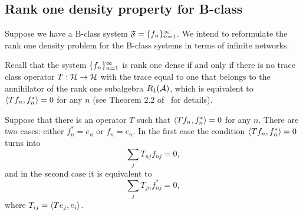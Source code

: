 \documentclass[12pt,oneside,a4paper]{amsart}
\begin{document}


    \medskip
    \subsection{Rank one density property for B-class}
      Suppose we have a B-class system $\fsys=\seq{f}$.
      We intend to reformulate the rank one density problem for the B-class systems in terms of infinite networks.

      Recall that the system $\seq{f}$ is rank one dense
        if and only if there is no trace class operator $T: \cal{H} \to \cal{H}$ with the trace equal to one
        that belongs to the annihilator of the rank one subalgebra $R_1(\cal{A})$, which is equivalent to
        $\inner{Tf_n}{f_n^*} = 0$ for any $n$
        (see Theorem 2.2 of~\cite{katavolos} for details).

      Suppose that there is an operator $T$ such that $\inner{Tf_n}{f_n^*} = 0$ for any $n$.
      There are two cases: either $f^*_n = e_n$ or $f_n = e_n$.
      In the first case the condition $\inner{Tf_n}{f_n^*} = 0$ turns into
      \begin{equation}
          \label{left-eqn}
          \sum_j T_{nj} f_{nj} = 0,
      \end{equation}
      and in the second case it is equivalent to
      \begin{equation}
          \label{right-eqn}
          \sum_j T_{jn} f^*_{nj} = 0,
      \end{equation}
      where $T_{ij} = \inner{Te_j}{e_i}$.
\end{document}
